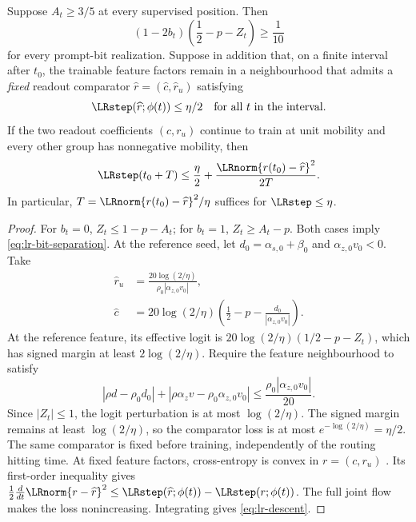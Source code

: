 \begin{lrlemma}
\label{lem:lr-readout-convergence}
Suppose $A_t\ge3/5$ at every supervised position.  Then
\begin{equation}\label{eq:lr-bit-separation}
 (1-2b_t)\left(\frac12-p-Z_t\right)\ge\frac1{10}
\end{equation}
for every prompt-bit realization.  Suppose in addition that, on a
finite interval after $t_0$, the trainable feature factors remain in a
neighbourhood that admits a \emph{fixed} readout comparator
$\widehat r=(\widehat c,\widehat r_u)$ satisfying
\begin{equation}\label{eq:lr-comparator}
 \LRstep(\widehat r;\phi(t))\le\eta/2
 \quad\text{for all }t\text{ in the interval}.
\end{equation}
If the two readout coefficients $(c,r_u)$ continue to train at unit
mobility and every other group has nonnegative mobility, then
\begin{equation}\label{eq:lr-descent}
 \LRstep(t_0+T)\le\frac\eta2+
 \frac{\LRnorm{r(t_0)-\widehat r}^2}{2T}.
\end{equation}
In particular, $T=\LRnorm{r(t_0)-\widehat r}^2/\eta$ suffices for
$\LRstep\le\eta$.
\end{lrlemma}
\begin{proof}
For $b_t=0$, $Z_t\le1-p-A_t$; for $b_t=1$,
$Z_t\ge A_t-p$.  Both cases imply
\eqref{eq:lr-bit-separation}.
At the reference seed, let $d_0=\alpha_{s,0}+\beta_0$ and $\alpha_{z,0}v_0<0$. Take
\[
 \begin{aligned}
 \widehat r_u&=\frac{20\log(2/\eta)}{\rho_0|\alpha_{z,0}v_0|},\\
 \widehat c&=20\log(2/\eta)\left(\frac12-p-\frac{d_0}{|\alpha_{z,0}v_0|}\right).
 \end{aligned}
\] 
At the reference feature, its effective logit is
$20\log(2/\eta)(1/2-p-Z_t)$, which has signed margin at least $2\log(2/\eta)$.
Require the feature neighbourhood to satisfy
\begin{equation}\label{eq:lr-comparator-stability}
 |\rho d-\rho_0d_0|+|\rho {\alpha_z v}-\rho_0{\alpha_{z,0}v_0}|
 \le\frac{\rho_0|{\alpha_{z,0}v_0}|}{20}.
\end{equation}
Since $|Z_t|\le1$, the logit perturbation is at most $\log(2/\eta)$.
The signed margin remains at least $\log(2/\eta)$, so the comparator loss is
at most $e^{-\log(2/\eta)}=\eta/2$. The same comparator is fixed before training,
independently of the routing hitting time.
At fixed feature factors, cross-entropy is convex in $r=(c,r_u)$ \citep[Section~3.1.5]{boyd2004convex}. Its first-order inequality \citep[Section~3.1.3]{boyd2004convex} gives
$\frac12\frac{d}{dt}\LRnorm{r-\widehat r}^2
\le\LRstep(\widehat r;\phi(t))-\LRstep(r;\phi(t))$.
The full joint flow makes the loss nonincreasing.  Integrating gives
\eqref{eq:lr-descent}.
\end{proof}

